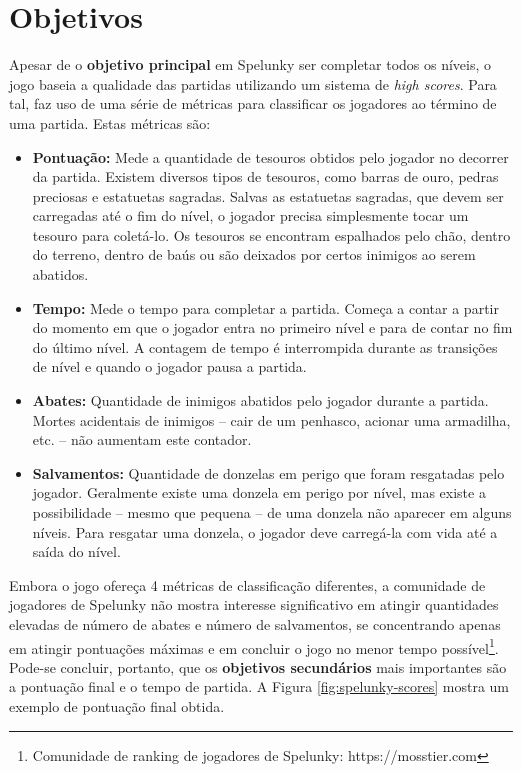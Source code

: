 \section{\label{section:spelunky-goals}Objetivos}
Apesar de o \textbf{objetivo principal} em Spelunky ser completar todos os
níveis, o jogo baseia a qualidade das partidas utilizando um sistema de
\textit{high scores}. Para tal, faz uso de uma série de métricas para
classificar os jogadores ao término de uma partida. Estas métricas são:

\begin{itemize}
	\item \textbf{Pontuação:} Mede a quantidade de tesouros obtidos pelo jogador
	no decorrer da partida. Existem diversos tipos de tesouros, como barras de
	ouro, pedras preciosas e estatuetas sagradas. Salvas as estatuetas sagradas,
	que devem ser carregadas até o fim do nível, o jogador precisa simplesmente
	tocar um tesouro para coletá-lo. Os tesouros se encontram espalhados pelo
	chão, dentro do terreno, dentro de baús ou são deixados por certos inimigos
	ao serem abatidos.

	\item \textbf{Tempo:} Mede o tempo para completar a partida. Começa a contar
	a partir do momento em que o jogador entra no primeiro nível e para de
	contar no fim do último nível. A contagem de tempo é interrompida durante as
	transições de nível e quando o jogador pausa a partida.

	\item \textbf{Abates:} Quantidade de inimigos abatidos pelo jogador durante
	a partida. Mortes acidentais de inimigos -- cair de um penhasco, acionar uma
	armadilha, etc. -- não aumentam este contador.

	\item \textbf{Salvamentos:} Quantidade de donzelas em perigo que foram
	resgatadas pelo jogador. Geralmente existe uma donzela em perigo por nível,
	mas existe a possibilidade -- mesmo que pequena -- de uma donzela não
	aparecer em alguns níveis. Para resgatar uma donzela, o jogador deve
	carregá-la com vida até a saída do nível.
\end{itemize}

Embora o jogo ofereça 4 métricas de classificação diferentes, a comunidade de
jogadores de Spelunky não mostra interesse significativo em atingir quantidades
elevadas de número de abates e número de salvamentos, se concentrando apenas em
atingir pontuações máximas e em concluir o jogo no menor tempo
possível\footnote{Comunidade de ranking de jogadores de Spelunky:
https://mosstier.com}. Pode-se concluir, portanto, que os \textbf{objetivos
secundários} mais importantes são a pontuação final e o tempo de partida. A
Figura \ref{fig:spelunky-scores} mostra um exemplo de pontuação final obtida.

